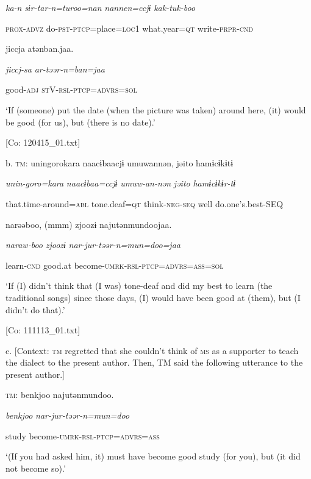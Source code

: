       \textit{ka-n}  \textit{sɨr-tar-n=turoo=nan}  \textit{nannen=ccjɨ}  \textit{kak-tuk-boo}

      \textsc{prox}-\textsc{advz}  do-\textsc{pst}-\textsc{ptcp}=place=\textsc{loc}1  what.year=\textsc{qt}  write-\textsc{prpr}-\textsc{cnd}

      jiccja  atənban.jaa.  

      \textit{jiccj-sa}  \textit{ar-təər{}-n=ban=jaa} 

      good-\textsc{adj}  \textsc{st}V-\textsc{rsl}-\textsc{ptcp}=\textsc{advrs}=\textsc{sol}

      ‘If (someone) put the date (when the picture was taken) around here, (it) would be good (for us), but (there is no date).’

      [Co: 120415\_01.txt]

  b.  \textsc{tm}:  unin{\textbar}goro{\textbar}kara  naacɨbaacjɨ  umuwannən,  jəito  hamɨcɨkɨtɨ

      \textit{unin-goro=kara}  \textit{naacɨbaa=ccjɨ}  \textit{umuw-an-nən}  \textit{jəito}  \textit{hamɨcɨkɨr-tɨ}

      that.time-around=\textsc{abl}  tone.deaf=\textsc{qt}  think-\textsc{neg}-\textsc{seq}  well  do.one’s.best-SEQ

      narəəboo,  (mmm)  zjoozɨ  najutənmundoojaa.

      \textit{naraw-boo}    \textit{zjoozɨ}  \textit{nar-jur-təər{}-n=mun=doo=jaa}

      learn-\textsc{cnd}    good.at  become-\textsc{umrk}-\textsc{rsl}-\textsc{ptcp}=\textsc{advrs}=\textsc{ass}=\textsc{sol}

      ‘If (I) didn’t think that (I was) tone-deaf and did my best to learn (the traditional songs) since those days, (I) would have been good at (them), but (I didn’t do that).’

      [Co: 111113\_01.txt]

  c.  [Context: \textsc{tm} regretted that she couldn’t think of \textsc{ms} as a supporter to teach the dialect to the present author. Then, TM said the following utterance to the present author.]

    \textsc{tm}:  {\textbar}benkjoo{\textbar}  najutənmundoo.

      \textit{benkjoo}  \textit{nar-jur-təər{}-n=mun=doo}

      study  become-\textsc{umrk}-\textsc{rsl}-\textsc{ptcp}=\textsc{advrs}=\textsc{ass}

      ‘(If you had asked him, it) must have become good study (for you), but (it did not become so).’


